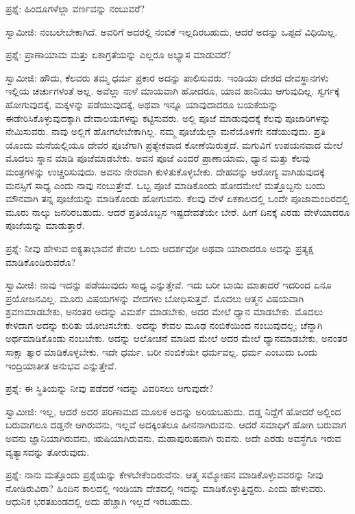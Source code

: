 ಪ್ರಶ್ನೆ: ಹಿಂದೂಗಳೆಲ್ಲಾ ವರ್ಣವನ್ನು ನಂಬುವರೆ?

ಸ್ವಾಮೀಜಿ: ನಂಬಲೇಬೇಕಾಗಿದೆ. ಅವರಿಗೆ ಅದರಲ್ಲಿ ನಂಬಿಕೆ ಇಲ್ಲದಿರಬಹುದು, ಆದರೆ ಅದನ್ನು ಒಪ್ಪದೆ ವಿಧಿಯಿಲ್ಲ.

ಪ್ರಶ್ನೆ: ಪ್ರಾಣಾಯಾಮ ಮತ್ತು ಏಕಾಗ್ರತೆಯನ್ನು ಎಲ್ಲರೂ ಅಭ್ಯಾಸ ಮಾಡುವರೆ?

ಸ್ವಾಮೀಜಿ: ಹೌದು, ಕೆಲವರು ತಮ್ಮ ಧರ್ಮ ಪ್ರಕಾರ ಅದನ್ನು ಪಾಲಿಸುವರು. ಇಂಡಿಯಾ ದೇಶದ ದೇವಸ್ಥಾನಗಳು ಇಲ್ಲಿಯ ಚರ್ಚುಗಳಂತೆ ಅಲ್ಲ. ಅವೆಲ್ಲಾ ನಾಳೆ ಮಾಯವಾಗಿ ಹೋದರೂ, ಯಾವ ಹಾನಿಯು ಆಗುವುದಿಲ್ಲ. ಸ್ವರ್ಗಕ್ಕೆ ಹೋಗುವುದಕ್ಕೆ, ಮಕ್ಕಳನ್ನು ಪಡೆಯುವುದಕ್ಕೆ, ಅಥವಾ ಇನ್ನೂ ಯಾವುದಾದರೂ ಬಯಕೆಯನ್ನು ಈಡೇರಿಸಿಕೊಳ್ಳುವುದಕ್ಕಾಗಿ ದೇವಾಲಯಗಳನ್ನು ಕಟ್ಟಿಸುವರು. ಅಲ್ಲಿ ಪೂಜೆ ಮಾಡುವುದಕ್ಕೆ ಕೆಲವು ಪೂಜಾರಿಗಳನ್ನು ನೇಮಿಸುವರು. ನಾವು ಅಲ್ಲಿಗೆ ಹೋಗಲೇಬೇಕಾಗಿಲ್ಲ. ನಮ್ಮ ಪೂಜೆಯೆಲ್ಲಾ ಮನೆಯೊಳಗೇ ನಡೆಯುವುದು. ಪ್ರತಿ ಯೊಂದು ಮನೆಯಲ್ಲಿಯೂ ದೇವರ ಪೂಜೆಗಾಗಿ ಪ್ರತ್ಯೇಕವಾದ ಕೋಣೆಯಿರುತ್ತದೆ. ಮಗುವಿಗೆ ಉಪಯನವಾದ ಮೇಲೆ ಮೊದಲು ಸ್ನಾನ ಮಾಡಿ ಪೂಜೆಮಾಡಬೇಕು. ಅವನ ಪೂಜೆ ಎಂದರೆ ಪ್ರಾಣಾಯಾಮ, ಧ್ಯಾನ ಮತ್ತು ಕೆಲವು ಮಂತ್ರಗಳನ್ನು ಉಚ್ಚರಿಸುವುದು. ಅವನು ನೇರವಾಗಿ ಕುಳಿತುಕೊಳ್ಳಬೇಕು. ದೇಹವನ್ನು ಆರೋಗ್ಯ ವಾಗಿಡುವುದಕ್ಕೆ ಮನಸ್ಸಿಗೆ ಸಾಧ್ಯ ಎಂದು ನಾವು ನಂಬುತ್ತೇವೆ. ಒಬ್ಬ ಪೂಜೆ ಮಾಡಿಕೊಂದು ಹೋದಮೇಲೆ ಮತ್ತೊಬ್ಬನು ಬಂದು ಮೌನವಾಗಿ ತನ್ನ ಪೂಜೆಯನ್ನು ಮಾಡಿಕೊಂಡು ಹೋಗುವನು. ಕೆಲವು ವೇಳೆ ಏಕಕಾಲದಲ್ಲಿ ಒಂದೇ ಪೂಜಾಮಂದಿರದಲ್ಲಿ ಮೂರು ನಾಲ್ಕು ಜನರಿರಬಹುದು. ಆದರೆ ಪ್ರತಿಯೊಬ್ಬನ ಇಷ್ಟದೇವತೆಯೇ ಬೇರೆ. ಹೀಗೆ ದಿನಕ್ಕೆ ಎರಡು ವೇಳೆಯಾದರೂ ಪೂಜೆಯನ್ನು ಮಾಡುತ್ತಾರೆ.

ಪ್ರಶ್ನೆ: ನೀವು ಹೇಳುವ ಐಕ್ಯತಾಭಾವನೆ ಕೇವಲ ಒಂದು ಆದರ್ಶವೋ ಅಥವಾ ಯಾರಾದರೂ ಅದನ್ನು ಪ್ರತ್ಯಕ್ಷ ಮಾಡಿಕೊಂಡಿರುವರೊ?

ಸ್ವಾಮೀಜಿ: ನಾವು ಇದನ್ನು ಪಡೆಯುವುದು ಸಾಧ್ಯ ಎನ್ನುತ್ತೇವೆ. ಇದು ಬರೀ ಬಾಯಿ ಮಾತಾದರೆ ಇದರಿಂದ ಏನೂ ಪ್ರಯೋಜನವಿಲ್ಲ. ಮೂರು ವಿಷಯಗಳನ್ನು ವೇದಗಳು ಬೋಧಿಸುತ್ತವೆ. ಮೊದಲು ಆತ್ಮನ ವಿಷಯವಾಗಿ ಶ್ರವಣಮಾಡಬೇಕು, ಅನಂತರ ಅದನ್ನು ವಿಮರ್ಶೆ ಮಾಡಬೇಕು, ಅದರ ಮೇಲೆ ಧ್ಯಾನ ಮಾಡಬೇಕು. ಮೊದಲು ಕೇಳಿದಾಗ ಅದನ್ನು ಕುರಿತು ಯೋಚಿಸಬೇಕು. ಅದನ್ನು ಕೇವಲ ಮೂಢ ನಂಬಿಕೆಯಿಂದ ನಂಬುವುದಲ್ಲ; ಚೆನ್ನಾಗಿ ಅರ್ಥಮಾಡಿಕೊಂಡು ನಂಬಬೇಕು. ಅದನ್ನು ಆಲೋಚನೆ ಮಾಡಿದ ಮೇಲೆ ಅದರ ಮೇಲೆ ಧ್ಯಾನಮಾಡಬೇಕು, ಅನಂತರ ಸಾಕ್ಷಾ ತ್ಕಾರ ಮಾಡಿಕೊಳ್ಳಬೇಕು. ಇದೇ ಧರ್ಮ. ಬರೀ ನಂಬಿಕೆಯೇ ಧರ್ಮವಲ್ಲ. ಧರ್ಮ ಎಂಬುದು ಒಂದು ಇಂದ್ರಿಯಾತೀತ ಅನುಭವ ಎನ್ನುತ್ತೇವೆ.

ಪ್ರಶ್ನೆ: ಈ ಸ್ಥಿತಿಯನ್ನು ನೀವು ಪಡೆದರೆ ಇದನ್ನು ವಿವರಿಸಲು ಆಗುವುದೇ?

ಸ್ವಾಮೀಜಿ: ಇಲ್ಲ, ಆದರೆ ಅದರ ಪರಿಣಾಮದ ಮೂಲಕ ಅದನ್ನು ಅರಿಯಬಹುದು. ದಡ್ಡ ನಿದ್ದೆಗೆ ಹೋದರೆ ಅಲ್ಲಿಂದ ಬರುವಾಗಲೂ ದಡ್ಡನೇ ಆಗಿರುವನು, ಇಲ್ಲವೆ ಅದಕ್ಕಿಂತಲೂ ಹೀನನಾಗಿರುವನು. ಆದರೆ ಸಮಾಧಿಗೆ ಹೋಗಿ ಬರುವಾಗ ಅವನು ಜ್ಞಾನಿಯಾಗಿರುವನು, ಋಷಿಯಾಗಿರುವನು, ಮಹಾಪುರುಷನಾಗಿ ರುವನು. ಅದೇ ಎರಡು ಅವಸ್ಥೆಗೂ ಇರುವ ವ್ಯತ್ಯಾಸವನ್ನು ತೋರುವುದು.

ಪ್ರಶ್ನೆ: ನಾನು ಮತ್ತೊಂದು ಪ್ರಶ್ನೆಯನ್ನು ಕೇಳಬೇಕೆಂದಿರುವೆನು. ಆತ್ಮ ಸಮ್ಮೋಹನ  ಮಾಡಿಕೊಳ್ಳುವವರನ್ನು ನೀವು ನೋಡಿರುವಿರಾ? ಹಿಂದಿನ ಕಾಲದಲ್ಲಿ ಇಂಡಿಯಾ ದೇಶದಲ್ಲಿ ಇದನ್ನು ಮಾಡಿಕೊಳ್ಳುತ್ತಿದ್ದರು. ಎಂದು ಹೇಳುವರು. ಆಧುನಿಕ ಭರತಖಂಡದಲ್ಲಿ ಅದು ಹೆಚ್ಚಾಗಿ ಇಲ್ಲದೆ ಇರಬಹುದು.

